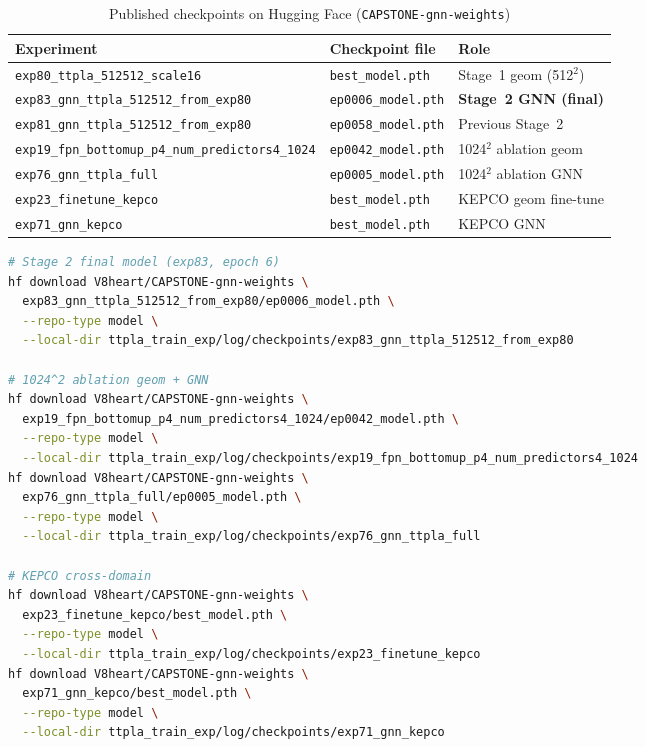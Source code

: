 \documentclass[11pt,a4paper]{article}
\begin{document}
\begin{table}[H]
\centering
\caption{Published checkpoints on Hugging Face (\texttt{CAPSTONE-gnn-weights})}
\begin{tabular}{lll}
\toprule
Experiment & Checkpoint file & Role \\
\midrule
\texttt{exp80\_ttpla\_512512\_scale16} & \texttt{best\_model.pth} & Stage~1 geom (512$^2$) \\
\texttt{exp83\_gnn\_ttpla\_512512\_from\_exp80} & \texttt{ep0006\_model.pth} & \textbf{Stage~2 GNN (final)} \\
\texttt{exp81\_gnn\_ttpla\_512512\_from\_exp80} & \texttt{ep0058\_model.pth} & Previous Stage~2 \\
\texttt{exp19\_fpn\_bottomup\_p4\_num\_predictors4\_1024} & \texttt{ep0042\_model.pth} & 1024$^2$ ablation geom \\
\texttt{exp76\_gnn\_ttpla\_full} & \texttt{ep0005\_model.pth} & 1024$^2$ ablation GNN \\
\texttt{exp23\_finetune\_kepco} & \texttt{best\_model.pth} & KEPCO geom fine-tune \\
\texttt{exp71\_gnn\_kepco} & \texttt{best\_model.pth} & KEPCO GNN \\
\bottomrule
\end{tabular}
\end{table}

\begin{lstlisting}[language=bash, numbers=none]
# Stage 2 final model (exp83, epoch 6)
hf download V8heart/CAPSTONE-gnn-weights \
  exp83_gnn_ttpla_512512_from_exp80/ep0006_model.pth \
  --repo-type model \
  --local-dir ttpla_train_exp/log/checkpoints/exp83_gnn_ttpla_512512_from_exp80

# 1024^2 ablation geom + GNN
hf download V8heart/CAPSTONE-gnn-weights \
  exp19_fpn_bottomup_p4_num_predictors4_1024/ep0042_model.pth \
  --repo-type model \
  --local-dir ttpla_train_exp/log/checkpoints/exp19_fpn_bottomup_p4_num_predictors4_1024
hf download V8heart/CAPSTONE-gnn-weights \
  exp76_gnn_ttpla_full/ep0005_model.pth \
  --repo-type model \
  --local-dir ttpla_train_exp/log/checkpoints/exp76_gnn_ttpla_full

# KEPCO cross-domain
hf download V8heart/CAPSTONE-gnn-weights \
  exp23_finetune_kepco/best_model.pth \
  --repo-type model \
  --local-dir ttpla_train_exp/log/checkpoints/exp23_finetune_kepco
hf download V8heart/CAPSTONE-gnn-weights \
  exp71_gnn_kepco/best_model.pth \
  --repo-type model \
  --local-dir ttpla_train_exp/log/checkpoints/exp71_gnn_kepco
\end{lstlisting}
\end{document}
